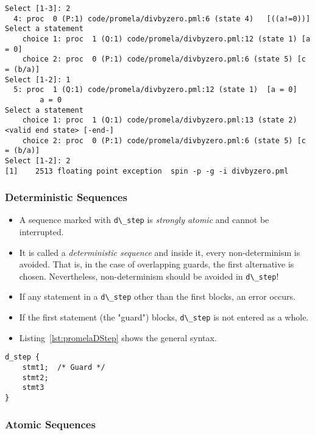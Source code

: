 \documentclass[a4paper, 11pt, accentcolor = tud3b]{tudreport}
\newcommand{\inlinePromela}[1]{\lstinline[language = PROMELA]|#1|}
\begin{document}
\begin{itemize}
\begin{lstlisting}[numbers = none]
Select [1-3]: 2
  4: proc  0 (P:1) code/promela/divbyzero.pml:6 (state 4)	[((a!=0))]
Select a statement
	choice 1: proc  1 (Q:1) code/promela/divbyzero.pml:12 (state 1) [a = 0]
	choice 2: proc  0 (P:1) code/promela/divbyzero.pml:6 (state 5) [c = (b/a)]
Select [1-2]: 1
  5: proc  1 (Q:1) code/promela/divbyzero.pml:12 (state 1)	[a = 0]
		a = 0
Select a statement
	choice 1: proc  1 (Q:1) code/promela/divbyzero.pml:13 (state 2) <valid end state> [-end-]
	choice 2: proc  0 (P:1) code/promela/divbyzero.pml:6 (state 5) [c = (b/a)]
Select [1-2]: 2
[1]    2513 floating point exception  spin -p -g -i divbyzero.pml
						\end{lstlisting}
				\end{itemize}
			
				

				\subsubsection{Deterministic Sequences}
					\begin{itemize}
						\item A sequence marked with \inlinePromela{d\_step} is \textit{strongly atomic} and cannot be interrupted.
						\item It is called a \textit{deterministic sequence} and inside it, every non-determinism is avoided. That is, in the case of overlapping guards, the first alternative is chosen. Nevertheless, non-determinism should be avoided in \inlinePromela{d\_step}!
						\item If any statement in a \inlinePromela{d\_step} other than the first blocks, an error occurs.
						\item If the first statement (the "guard") blocks, \inlinePromela{d\_step} is not entered as a whole.
						\item Listing~\ref{lst:promelaDStep} shows the general syntax.
					\end{itemize}
				
					\begin{lstlisting}[caption = { Deterministic Sequence in PROMELA }, label = ls:promelaDStep, language = PROMELA]
d_step {
	stmt1;  /* Guard */
	stmt2;
	stmt3
}
					\end{lstlisting}

				\subsubsection{Atomic Sequences}
					\label{sec:atomic}
				
\end{document}
